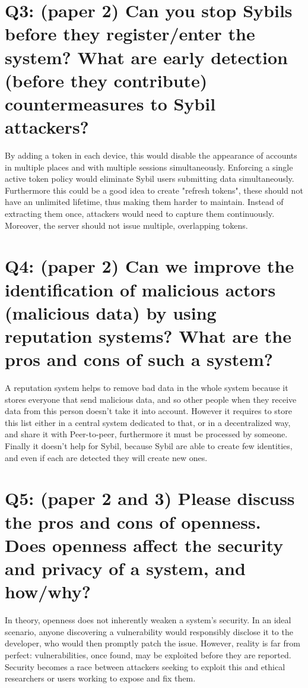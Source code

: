 \documentclass{article}
\begin{document}
\section*{
Q3: (paper 2) Can you stop Sybils before they register/enter the system? What are early detection (before they contribute) countermeasures to Sybil attackers?
}

By adding a token in each device, this would disable the appearance of accounts in multiple places and with multiple sessions simultaneously. Enforcing a single active token policy would eliminate Sybil users submitting data simultaneously. Furthermore this could be a good idea to create "refresh tokens", these should not have an unlimited lifetime, thus making them harder to maintain. Instead of extracting them once, attackers would need to capture them continuously. Moreover, the server should not issue multiple, overlapping tokens.


\section*{
Q4: (paper 2) Can we improve the identification of malicious actors (malicious data) by using reputation systems? What are the pros and cons of such a system?
}

A reputation system helps to remove bad data in the whole system because it stores everyone that send malicious data, and so other people when they receive data from this person doesn't take it into account. However it requires to store this list either in a central system dedicated to that, or in a decentralized way, and share it with Peer-to-peer, furthermore it must be processed by someone. Finally it doesn't help for Sybil, because Sybil are able to create few identities, and even if each are detected they will create new ones.

\section*{
Q5: (paper 2 and 3) Please discuss the pros and cons of openness. Does openness affect the security and privacy of a system, and how/why?
}
In theory, openness does not inherently weaken a system’s security. In an ideal scenario, anyone discovering a vulnerability would responsibly disclose it to the developer, who would then promptly patch the issue. However, reality is far from perfect: vulnerabilities, once found, may be exploited before they are reported. Security becomes a race between attackers seeking to exploit this and ethical researchers or users working to expose and fix them.
 
\end{document}
